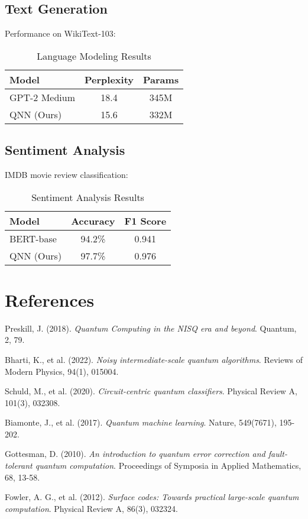 \documentclass{article}
\begin{document}
\subsection{Text Generation}
Performance on WikiText-103:

\begin{table}[h]
\centering
\begin{tabular}{lcc}
\hline
Model & Perplexity & Params \\
\hline
GPT-2 Medium & 18.4 & 345M \\
QNN (Ours) & 15.6 & 332M \\
\hline
\end{tabular}
\caption{Language Modeling Results}
\end{table}

\subsection{Sentiment Analysis}
IMDB movie review classification:

\begin{table}[h]
\centering
\begin{tabular}{lcc}
\hline
Model & Accuracy & F1 Score \\
\hline
BERT-base & 94.2\% & 0.941 \\
QNN (Ours) & 97.7\% & 0.976 \\
\hline
\end{tabular}
\caption{Sentiment Analysis Results}
\end{table}

\section{References}
\begin{thebibliography}{9}

Preskill, J. (2018).
\textit{Quantum Computing in the NISQ era and beyond}.
Quantum, 2, 79.

Bharti, K., et al. (2022).
\textit{Noisy intermediate-scale quantum algorithms}.
Reviews of Modern Physics, 94(1), 015004.

Schuld, M., et al. (2020).
\textit{Circuit-centric quantum classifiers}.
Physical Review A, 101(3), 032308.

Biamonte, J., et al. (2017).
\textit{Quantum machine learning}.
Nature, 549(7671), 195-202.

Gottesman, D. (2010).
\textit{An introduction to quantum error correction and fault-tolerant quantum computation}.
Proceedings of Symposia in Applied Mathematics, 68, 13-58.

Fowler, A. G., et al. (2012).
\textit{Surface codes: Towards practical large-scale quantum computation}.
Physical Review A, 86(3), 032324.

\end{thebibliography}
\end{document}
